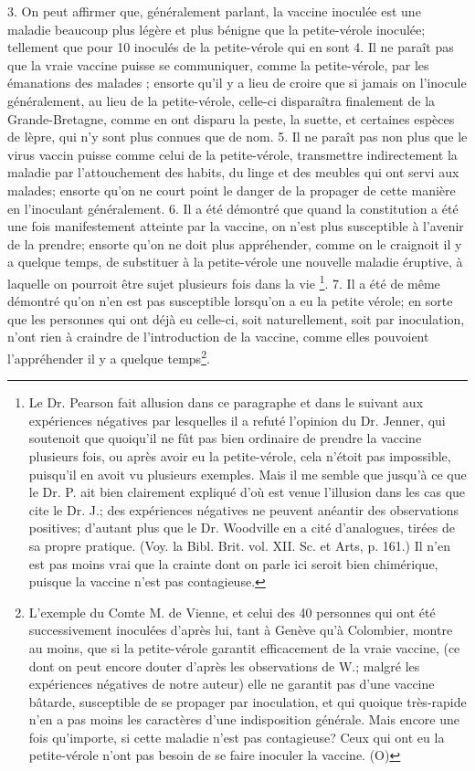 3. On peut affirmer que, généralement parlant, la vaccine inoculée est une maladie beaucoup plus légère et plus bénigne que la petite-vérole inoculée; tellement que pour 10 inoculés de la petite-vérole qui en sont\setcounter{page}{269} 4. Il ne paraît pas que la vraie vaccine puisse se communiquer, comme la petite-vérole, par les émanations des malades ; ensorte qu'il y a lieu de croire que si jamais on l'inocule généralement, au lieu de la petite-vérole, celle-ci disparaîtra finalement de la Grande-Bretagne, comme en ont disparu la peste, la suette, et certaines espèces de lèpre, qui n'y sont plus connues que de nom.
5. Il ne paraît pas non plus que le virus vaccin puisse comme celui de la petite-vérole, transmettre indirectement la maladie par l'attouchement\setcounter{page}{270} des habits, du linge et des meubles qui ont servi aux malades; ensorte qu'on ne court point le danger de la propager de cette manière en l'inoculant généralement.
6. Il a été démontré que quand la constitution a été une fois manifestement atteinte par la vaccine, on n'est plus susceptible à l'avenir de la prendre; ensorte qu'on ne doit plus appréhender, comme on le craignoit il y a quelque temps, de substituer à la petite-vérole une nouvelle maladie éruptive, à laquelle on pourroit être sujet plusieurs fois dans la vie \footnote{Le Dr. Pearson fait allusion dans ce paragraphe et dans le suivant aux expériences négatives par lesquelles il a refuté l'opinion du Dr. Jenner, qui soutenoit que quoiqu'il ne fût pas bien ordinaire de prendre la vaccine plusieurs fois, ou après avoir eu la petite-vérole, cela n'étoit pas impossible, puisqu'il en avoit vu plusieurs exemples. Mais il me semble que jusqu'à ce que le Dr. P. ait bien clairement expliqué d'où est venue l'illusion dans les cas que cite le Dr. J.; des expériences négatives ne peuvent anéantir des observations positives; d'autant plus que le Dr. Woodville en a cité d'analogues, tirées de sa propre pratique. (Voy. la Bibl. Brit. vol. XII. Sc. et Arts, p. 161.) Il n'en est pas moins vrai que la crainte dont on parle ici seroit bien chimérique, puisque la vaccine n'est pas contagieuse.}.
7. Il a été de même démontré qu'on n'en\setcounter{page}{271} est pas susceptible lorsqu'on a eu la petite vérole; en sorte que les personnes qui ont déjà eu celle-ci, soit naturellement, soit par inoculation, n'ont rien à craindre de l'introduction de la vaccine, comme elles pouvoient l'appréhender il y a quelque temps\footnote{L'exemple du Comte M. de Vienne, et celui des 40 personnes qui ont été successivement inoculées d'après lui, tant à Genève qu'à Colombier, montre au moins, que si la petite-vérole garantit efficacement de la vraie vaccine, (ce dont on peut encore douter d'après les observations de W.; malgré les expériences négatives de notre auteur) elle ne garantit pas d'une vaccine bâtarde, susceptible de se propager par inoculation, et qui quoique très-rapide n'en a pas moins les caractères d'une indisposition générale. Mais encore une fois qu'importe, si cette maladie n'est pas contagieuse? Ceux qui ont eu la petite-vérole n'ont pas besoin de se faire inoculer la vaccine. (O)}.
